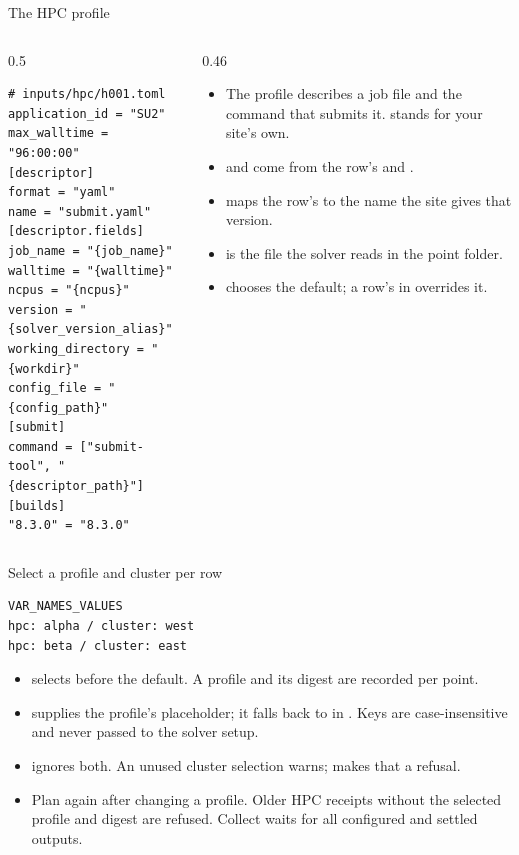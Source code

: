 \begin{frame}[fragile]{The HPC profile}
\begin{columns}[T]
\begin{column}{0.5\textwidth}
\begin{lstlisting}[style=cfdbtoml]
# inputs/hpc/h001.toml
application_id = "SU2"
max_walltime = "96:00:00"
[descriptor]
format = "yaml"
name = "submit.yaml"
[descriptor.fields]
job_name = "{job_name}"
walltime = "{walltime}"
ncpus = "{ncpus}"
version = "{solver_version_alias}"
working_directory = "{workdir}"
config_file = "{config_path}"
[submit]
command = ["submit-tool", "{descriptor_path}"]
[builds]
"8.3.0" = "8.3.0"
\end{lstlisting}
\end{column}
\begin{column}{0.46\textwidth}
\begin{itemize}\small
  \item The profile describes a job file and the command that submits it.
         stands for your site's own.
  \item {} and  come from the row's
         and .
  \item \code{[builds]} maps the row's  to the name the
        site gives that version.
  \item {} is the file the solver reads in the point
        folder.
  \item {} chooses the default; a row's 
        in  overrides it.
\end{itemize}
\end{column}
\end{columns}
\end{frame}

\begin{frame}[fragile]{Select a profile and cluster per row}
\begin{lstlisting}
VAR_NAMES_VALUES
hpc: alpha / cluster: west
hpc: beta / cluster: east
\end{lstlisting}
\begin{itemize}\small
  \item {} selects  before the
         default. A profile and its digest are recorded per point.
  \item {} supplies the profile's 
        placeholder; it falls back to  in .
        Keys are case-insensitive and never passed to the solver setup.
  \item {} ignores both. An unused cluster selection warns;
         makes that a refusal.
  \item Plan again after changing a profile. Older HPC receipts without the
        selected profile and digest are refused. Collect waits for all
        configured  and settled outputs.
\end{itemize}
\end{frame}

